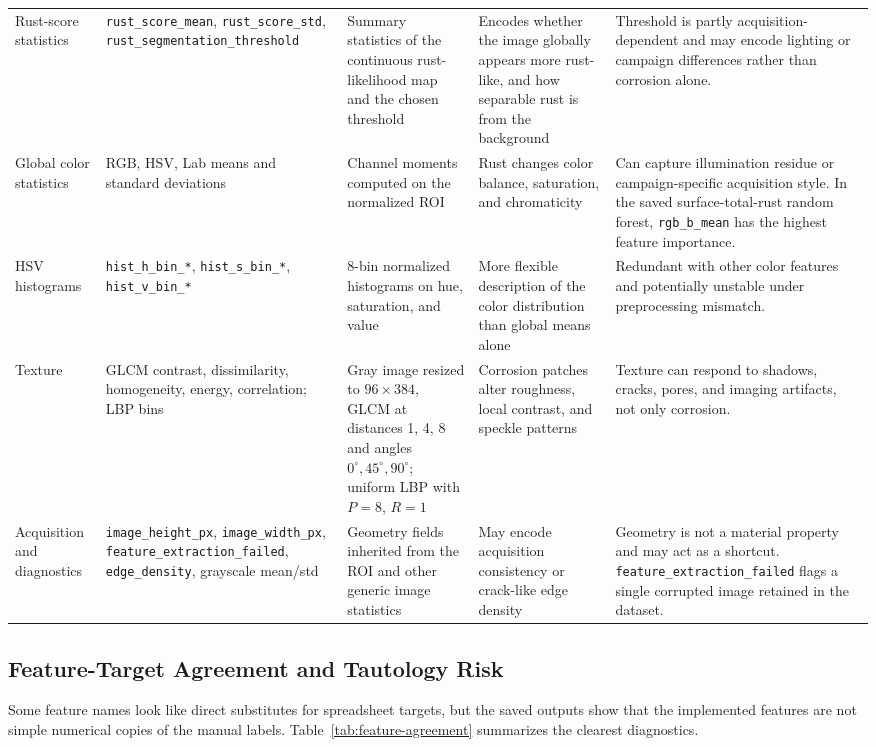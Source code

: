 \documentclass[11pt,a4paper]{article}
\begin{document}
\begin{longtable}{P{2.6cm}P{3.6cm}P{3.4cm}P{2.7cm}P{3.3cm}}
Rust-score statistics & \texttt{rust\_score\_mean}, \texttt{rust\_score\_std}, \texttt{rust\_segmentation\_threshold} & Summary statistics of the continuous rust-likelihood map and the chosen threshold & Encodes whether the image globally appears more rust-like, and how separable rust is from the background & Threshold is partly acquisition-dependent and may encode lighting or campaign differences rather than corrosion alone. \\
Global color statistics & RGB, HSV, Lab means and standard deviations & Channel moments computed on the normalized ROI & Rust changes color balance, saturation, and chromaticity & Can capture illumination residue or campaign-specific acquisition style. In the saved surface-total-rust random forest, \texttt{rgb\_b\_mean} has the highest feature importance. \\
HSV histograms & \texttt{hist\_h\_bin\_*}, \texttt{hist\_s\_bin\_*}, \texttt{hist\_v\_bin\_*} & 8-bin normalized histograms on hue, saturation, and value & More flexible description of the color distribution than global means alone & Redundant with other color features and potentially unstable under preprocessing mismatch. \\
Texture & GLCM contrast, dissimilarity, homogeneity, energy, correlation; LBP bins & Gray image resized to \(96 \times 384\), GLCM at distances 1, 4, 8 and angles \(0^\circ,45^\circ,90^\circ\); uniform LBP with \(P=8\), \(R=1\) & Corrosion patches alter roughness, local contrast, and speckle patterns & Texture can respond to shadows, cracks, pores, and imaging artifacts, not only corrosion. \\
Acquisition and diagnostics & \texttt{image\_height\_px}, \texttt{image\_width\_px}, \texttt{feature\_extraction\_failed}, \texttt{edge\_density}, grayscale mean/std & Geometry fields inherited from the ROI and other generic image statistics & May encode acquisition consistency or crack-like edge density & Geometry is not a material property and may act as a shortcut. \texttt{feature\_extraction\_failed} flags a single corrupted image retained in the dataset. \\
\end{longtable}

\subsection{Feature-Target Agreement and Tautology Risk}

Some feature names look like direct substitutes for spreadsheet targets, but the saved outputs show that the implemented features are not simple numerical copies of the manual labels. Table~\ref{tab:feature-agreement} summarizes the clearest diagnostics.
\end{document}
